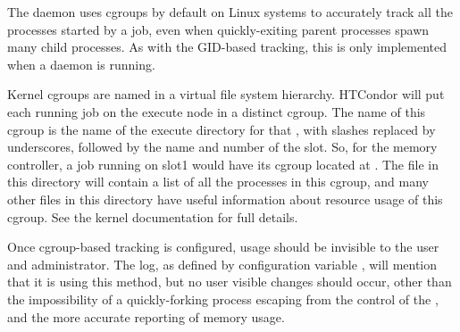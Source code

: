 The  daemon uses cgroups by default on Linux systems
to accurately track all the processes started by a job, 
even when quickly-exiting parent processes spawn many child processes.
As with the GID-based tracking, this is only implemented when a 
 daemon is running.  

Kernel cgroups are named in a virtual file system hierarchy. 
HTCondor will put each running job on the execute node in a distinct cgroup.
The name of this cgroup is the name of the execute directory for 
that , with slashes replaced by underscores, 
followed by the name and number of the slot.  
So, for the memory controller, 
a job running on slot1 would have its cgroup located at
.  
The  file in this directory will contain a list 
of all the processes in this cgroup, and
many other files in this directory have useful information about resource usage
of this cgroup.  See the kernel documentation for full details.

Once cgroup-based tracking is configured, 
usage should be invisible to the user and administrator.  
The  log, as defined by configuration variable
, 
will mention that it is using this method, 
but no user visible changes should occur,
other than the impossibility of a quickly-forking process escaping from the
control of the ,
and the more accurate reporting of memory usage.
